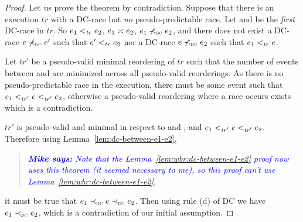 \documentclass[letter,10pt]{article}
\newtheorem{thm}{Theorem}
\newcommand{\conflicts}[2]{\ensuremath{#1 \asymp #2}} %
\newcommand{\tr}{\ensuremath{\mathit{tr}}\xspace}
\newcommand{\trPrime}{\ensuremath{\mathit{tr'}}\xspace}
\newcommand{\WDC}{DC\xspace}
\newcommand{\DC}{\WDC}
\newcommand{\DCOrdered}[2]{\WDCOrdered{#1}{#2}}
\newcommand{\nDCOrdered}[2]{\nWDCOrdered{#1}{#2}}
\newcommand{\ltTR}{\ensuremath{<_\textsc{\tr}}\xspace}
\newcommand{\ltTRPrime}{\ensuremath{<_\textsc{\trPrime}}\xspace}
\newcommand{\ltWDC}{\ensuremath{\prec_\textsc{\tiny{\WDC}}}\xspace}
\newcommand{\nltWDC}{\ensuremath{\not\prec_\textsc{\tiny{\WDC}}}\xspace}
\newcommand{\Ordered}[3]{\ensuremath{#1 #2 #3}}
\newcommand{\TROrdered}[2]{\Ordered{#1}{\ltTR}{#2}}
\newcommand{\TRPrimeOrdered}[2]{\Ordered{#1}{\ltTRPrime}{#2}}
\newcommand{\WDCOrdered}[2]{\Ordered{#1}{\ltWDC}{#2}}
\newcommand{\nWDCOrdered}[2]{\Ordered{#1}{\nltWDC}{#2}}
\newcommand{\originalgrumbler}[2]{\begin{quote}\textcolor{blue}{\sl{\bf #1 says:} #2}\end{quote}}
\newcommand{\grumbler}[2]{\originalgrumbler{#1}{#2}}
\newcommand{\mike}[1]{\grumbler{Mike}{#1}}
\newcommand{\kaan}[1]{\grumbler{Kaan}{#1}}
\begin{document}
\begin{proof}
  Let us prove the theorem by contradiction. Suppose that there is an execution
  \tr with a \DC-race but \emph{no} pseudo-predictable race. Let 
  and  be the \emph{first} \DC-race in \tr. So
  \TROrdered{\event{e}{_1}}{\event{e}{_2}},
  \conflicts{\event{e}{_1}}{\event{e}{_2}},
  \nDCOrdered{\event{e}{_1}}{\event{e}{_2}},
  and there does not
  exist a \DC-race \nWDCOrdered{\event{e}{}}{\event{e}{'}} such that
  \TROrdered{\event{e}{'}}{\event{e}{_2}} nor a \DC-race
  \nWDCOrdered{\event{e}{}}{\event{e}{_2}} such that
  \TROrdered{\event{e}{_1}}{\event{e}{}}.

  Let \trPrime be a pseudo-valid minimal reordering of \tr such that the number
  of events between  and  are minimized across all
  pseudo-valid reorderings. As there is no pseudo-predictable race in the
  execution, there must be some event  such that
  \TRPrimeOrdered{\event{e}{_1}}{\TRPrimeOrdered{\event{e}}{\event{e}{_2}}},
  otherwise a pseudo-valid reordering where a race occurs exists which is a contradiction.

  \trPrime is pseudo-valid and minimal in respect to  and
  , and
  \TRPrimeOrdered{\event{e}{_1}}{\TRPrimeOrdered{\event{e}}{\event{e}{_2}}}.
  Therefore using Lemma~\ref{lem:dc-between-e1-e2},
  \mike{Note that the Lemma~\ref{lem:wbr:dc-between-e1-e2} proof now uses this theorem (it seemed necessary to me),
  so this proof can't use Lemma~\ref{lem:wbr:dc-between-e1-e2}.}
  it must be true that
  \DCOrdered{\event{e}{_1}}{\DCOrdered{\event{e}}{\event{e}{_2}}}. Then using
  rule (d) of \DC we have \DCOrdered{\event{e}{_1}}{\event{e}{_2}}, which is a
  contradiction of our initial assumption.
\end{proof}

%
\end{document}
